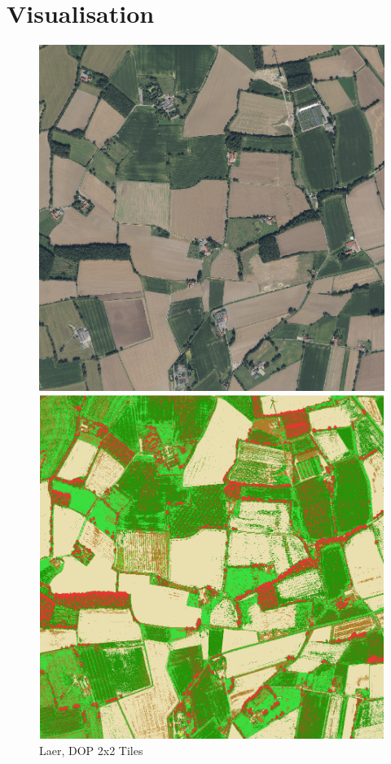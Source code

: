 \documentclass[
  t,%
]{_style/tudelft-beamerposter}
\begin{document}
\begin{frame}
\begin{columns}[onlytextwidth, T]
\begin{column}{}
      \section*{Visualisation}
        \begin{figure}[h!]
            \begin{minipage}{.5\textwidth}
                \centering
                \includegraphics[scale=0.45]{graphs/dop2x2laer.png}
                \caption{Laer, DOP 2x2 Tiles}
                \label{fig:sub1}
            \end{minipage}%
            \begin{minipage}{.5\textwidth}
                \centering
                \includegraphics[scale=0.45]{graphs/iteration2x2laer.png}

\end{minipage}
\end{figure}
\end{column}
\end{columns}
\end{frame}
\end{document}
